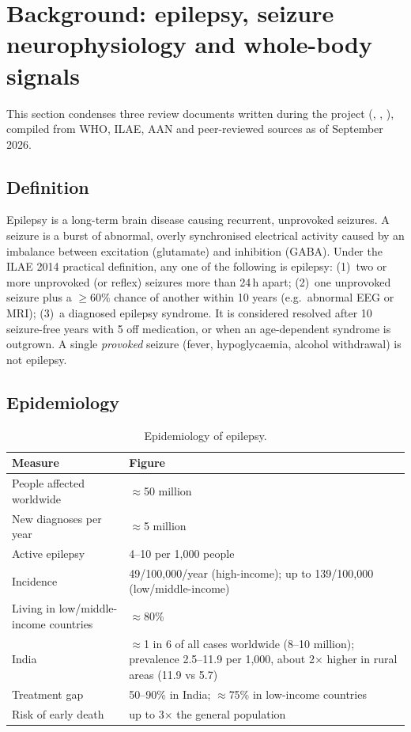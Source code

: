 \section{Background: epilepsy, seizure neurophysiology and whole-body signals}
\label{sec:background}

This section condenses three review documents written during the project (, , ), compiled from WHO, ILAE, AAN and peer-reviewed sources as of September 2026.

\subsection{Definition}

Epilepsy is a long-term brain disease causing recurrent, unprovoked seizures. A seizure is a burst of abnormal, overly synchronised electrical activity caused by an imbalance between excitation (glutamate) and inhibition (GABA). Under the ILAE 2014 practical definition, any one of the following is epilepsy: (1)~two or more unprovoked (or reflex) seizures more than 24\,h apart; (2)~one unprovoked seizure plus a $\ge$60\% chance of another within 10 years (e.g.\ abnormal EEG or MRI); (3)~a diagnosed epilepsy syndrome. It is considered resolved after 10 seizure-free years with 5 off medication, or when an age-dependent syndrome is outgrown. A single \emph{provoked} seizure (fever, hypoglycaemia, alcohol withdrawal) is not epilepsy.

\subsection{Epidemiology}

\begin{table}[H]
\centering\small
\caption{Epidemiology of epilepsy.}
\begin{tabularx}{\linewidth}{@{}l L@{}}
\toprule
Measure & Figure \\
\midrule
People affected worldwide & $\approx$50 million \\
New diagnoses per year & $\approx$5 million \\
Active epilepsy & 4--10 per 1,000 people \\
Incidence & 49/100,000/year (high-income); up to 139/100,000 (low/middle-income) \\
Living in low/middle-income countries & $\approx$80\% \\
India & $\approx$1 in 6 of all cases worldwide (8--10 million); prevalence 2.5--11.9 per 1,000, about 2$\times$ higher in rural areas (11.9 vs 5.7) \\
Treatment gap & 50--90\% in India; $\approx$75\% in low-income countries \\
Risk of early death & up to 3$\times$ the general population \\
\bottomrule
\end{tabularx}
\end{table}

